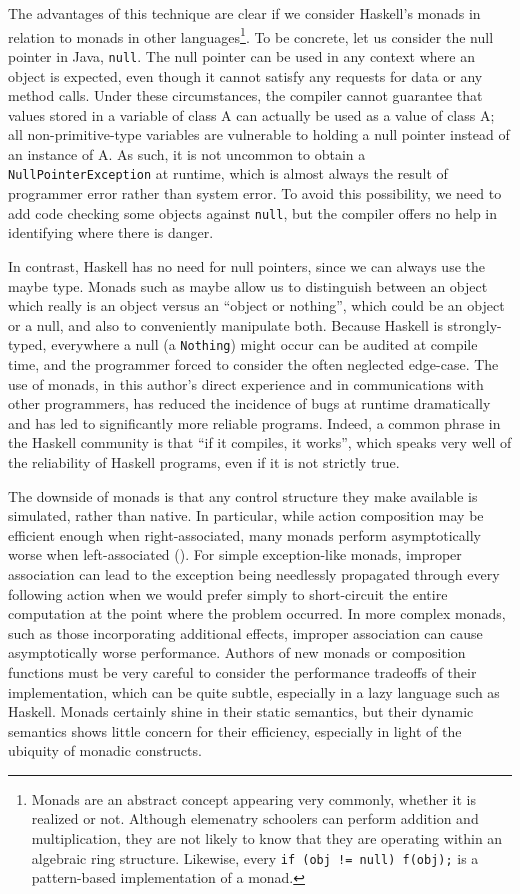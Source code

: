 \documentclass[11pt]{article}
\begin{document}
The advantages of this technique are clear if we consider Haskell's monads in relation to monads in other languages\footnote{Monads are an abstract concept appearing very commonly, whether it is realized or not. Although elemenatry schoolers can perform addition and multiplication, they are not likely to know that they are operating within an algebraic ring structure. Likewise, every \texttt{if (obj != null) f(obj);} is a pattern-based implementation of a monad.}.
To be concrete, let us consider the null pointer in Java, \texttt{null}.
The null pointer can be used in any context where an object is expected, even though it cannot satisfy any requests for data or any method calls.
Under these circumstances, the compiler cannot guarantee that values stored in a variable of class A can actually be used as a value of class A; all non-primitive-type variables are vulnerable to holding a null pointer instead of an instance of A.
As such, it is not uncommon to obtain a \texttt{NullPointerException} at runtime, which is almost always the result of programmer error rather than system error.
To avoid this possibility, we need to add code checking some objects against \texttt{null}, but the compiler offers no help in identifying where there is danger.

In contrast, Haskell has no need for null pointers, since we can always use the maybe type.
Monads such as maybe allow us to distinguish between an object which really is an object versus an ``object or nothing'', which could be an object or a null, and also to conveniently manipulate both.
Because Haskell is strongly-typed, everywhere a null (a \texttt{Nothing}) might occur can be audited at compile time, and the programmer forced to consider the often neglected edge-case.
The use of monads, in this author's direct experience and in communications with other programmers, has reduced the incidence of bugs at runtime dramatically and has led to significantly more reliable programs.
Indeed, a common phrase in the Haskell community is that ``if it compiles, it works'', which speaks very well of the reliability of Haskell programs, even if it is not strictly true.


The downside of monads is that any control structure they make available is simulated, rather than native.
In particular, while action composition may be efficient enough when right-associated, many monads perform asymptotically worse when left-associated (\cite{ReflectionWithoutRemorse}).
For simple exception-like monads, improper association can lead to the exception being needlessly propagated through every following action when we would prefer simply to short-circuit the entire computation at the point where the problem occurred.
In more complex monads, such as those incorporating additional effects, improper association can cause asymptotically worse performance.
Authors of new monads or composition functions must be very careful to consider the performance tradeoffs of their implementation, which can be quite subtle, especially in a lazy language such as Haskell.
Monads certainly shine in their static semantics, but their dynamic semantics shows little concern for their efficiency, especially in light of the ubiquity of monadic constructs.
\end{document}

